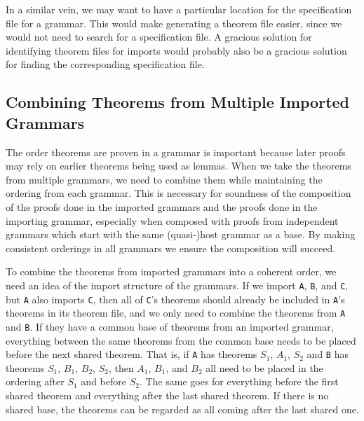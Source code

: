 \documentclass[11pt]{article}
\newcommand{\grammar}[1]{\texttt{#1}}
\begin{document}
In a similar vein, we may want to have a particular location for the
specification file for a grammar.  This would make generating a
theorem file easier, since we would not need to search for a
specification file.  A gracious solution for identifying theorem files
for imports would probably also be a gracious solution for finding the
corresponding specification file.




\subsection{Combining Theorems from Multiple Imported Grammars} \label{subsec:ordering}

The order theorems are proven in a grammar is important because later
proofs may rely on earlier theorems being used as lemmas.  When we
take the theorems from multiple grammars, we need to combine them
while maintaining the ordering from each grammar.  This is necessary
for soundness of the composition of the proofs done in the imported
grammars and the proofs done in the importing grammar, especially when
composed with proofs from independent grammars which start with the
same (quasi-)host grammar as a base.  By making consistent orderings
in all grammars we ensure the composition will succeed.


To combine the theorems from imported grammars into a coherent order,
we need an idea of the import structure of the grammars.  If we import
\grammar{A}, \grammar{B}, and \grammar{C}, but \grammar{A} also
imports \grammar{C}, then all of \grammar{C}'s theorems should already
be included in \grammar{A}'s theorems in its theorem file, and we only
need to combine the theorems from \grammar{A} and \grammar{B}.  If
they have a common base of theorems from an imported grammar,
everything between the same theorems from the common base needs to be
placed before the next shared theorem.  That is, if \grammar{A} has
theorems $S_1$, $A_1$, $S_2$ and \grammar{B} has theorems $S_1$,
$B_1$, $B_2$, $S_2$, then $A_1$, $B_1$, and $B_2$ all need to be
placed in the ordering after $S_1$ and before $S_2$.  The same goes
for everything before the first shared theorem and everything after
the last shared theorem.  If there is no shared base, the theorems can
be regarded as all coming after the last shared one.
\end{document}
